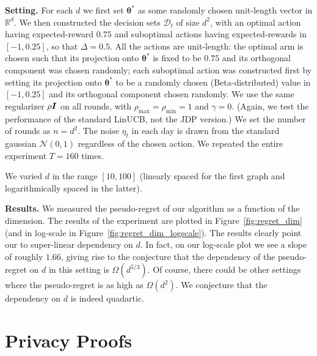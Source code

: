 \documentclass{article}
\renewcommand{\vec}[1]{\bm{#1}}
\newcommand{\Real}{\mathds{R}}
\newcommand{\D}{\mathcal{D}}
\newcommand{\Normal}{\mathcal{N}}
\newcommand{\Eye}[1][]{\bm{I}\notblank{#1}{_{{#1}\times{#1}}}{}}
\renewcommand{\paragraph}[1]{\vspace{2pt}\noindent\textbf{#1}}
\begin{document}
\paragraph{Setting.} For each $d$ we first set $\vec\theta^*$ as some randomly chosen unit-length vector in $\Real^d$. We then constructed the decision sets $\D_t$ of size
$d^2$, with an optimal action having expected-reward $0.75$ and suboptimal actions
having expected-rewards in $[-1, 0.25]$, so that $\Delta = 0.5$.  All the
actions are unit-length: the optimal arm is chosen such that its projection onto $\vec\theta^*$ is fixed to be $0.75$ and its orthogonal component was chosen randomly; each suboptimal action was constructed first by setting its projection onto $\vec \theta^*$ to be a randomly chosen (Beta-distributed) value in $[-1,0.25]$ and its orthogonal component chosen randomly.  We use the same
regularizer $\rho\Eye$ on all rounds, with
$\rho_{\max}=\rho_{\min}=1$ and $\gamma=0$. (Again, we test the performance of the standard LinUCB, not the JDP version.)  We set the number of
rounds as $n=d^2$. The noise $\eta_t$ in each day is drawn from the standard
gaussian $\Normal(0,1)$ regardless of the chosen action. We repeated the entire experiment $T=160$ times. 

We varied $d$ in the range $[10, 100]$ (linearly spaced for the first
graph and logarithmically spaced in the latter).

\paragraph{Results.} We measured the pseudo-regret of our algorithm as a function of the dimension. The results of the experiment are plotted in Figure~\ref{fig:regret_dim} (and in log-scale in Figure~\ref{fig:regret_dim_logscale}). The results clearly point our to super-linear dependency on $d$. In fact, on our log-scale plot we see a slope of roughly $1.66$, giving rise to the conjecture that the dependency of the pseudo-regret on $d$ in this setting is $\Omega(d^{5/3})$. Of course, there could be other settings where the pseudo-regret is as high as $\Omega(d^2)$. We conjecture that the dependency on $d$ is indeed quadartic.

\section{Privacy Proofs}
\label{apx_sec:privacy_proofs}
\end{document}
